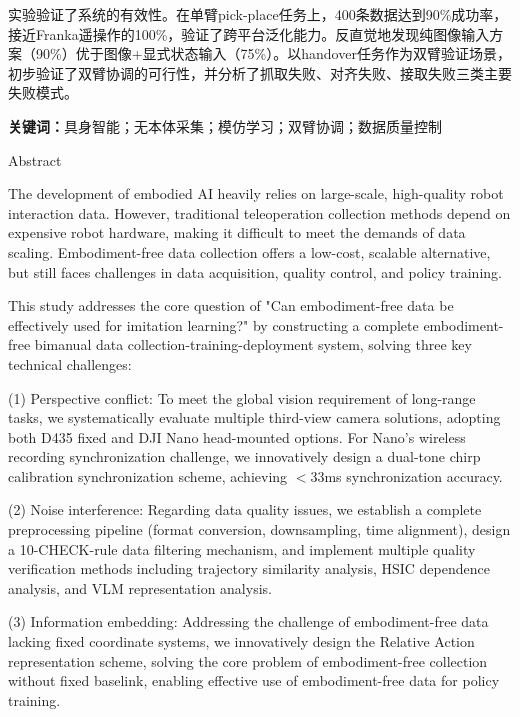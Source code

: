 实验验证了系统的有效性。在单臂pick-place任务上，400条数据达到90\%成功率，接近Franka遥操作的100\%，验证了跨平台泛化能力。反直觉地发现纯图像输入方案（90\%）优于图像+显式状态输入（75\%）。以handover任务作为双臂验证场景，初步验证了双臂协调的可行性，并分析了抓取失败、对齐失败、接取失败三类主要失败模式。

\vspace{0.5cm}
\noindent\textbf{关键词：}具身智能；无本体采集；模仿学习；双臂协调；数据质量控制

\newpage

\begin{center}
{\heiti Abstract}
\end{center}

\vspace{0.5cm}


The development of embodied AI heavily relies on large-scale, high-quality robot interaction data. However, traditional teleoperation collection methods depend on expensive robot hardware, making it difficult to meet the demands of data scaling. Embodiment-free data collection offers a low-cost, scalable alternative, but still faces challenges in data acquisition, quality control, and policy training.

This study addresses the core question of "Can embodiment-free data be effectively used for imitation learning?" by constructing a complete embodiment-free bimanual data collection-training-deployment system, solving three key technical challenges:

(1) Perspective conflict: To meet the global vision requirement of long-range tasks, we systematically evaluate multiple third-view camera solutions, adopting both D435 fixed and DJI Nano head-mounted options. For Nano's wireless recording synchronization challenge, we innovatively design a dual-tone chirp calibration synchronization scheme, achieving $<$33ms synchronization accuracy.

(2) Noise interference: Regarding data quality issues, we establish a complete preprocessing pipeline (format conversion, downsampling, time alignment), design a 10-CHECK-rule data filtering mechanism, and implement multiple quality verification methods including trajectory similarity analysis, HSIC dependence analysis, and VLM representation analysis.

(3) Information embedding: Addressing the challenge of embodiment-free data lacking fixed coordinate systems, we innovatively design the Relative Action representation scheme, solving the core problem of embodiment-free collection without fixed baselink, enabling effective use of embodiment-free data for policy training.

